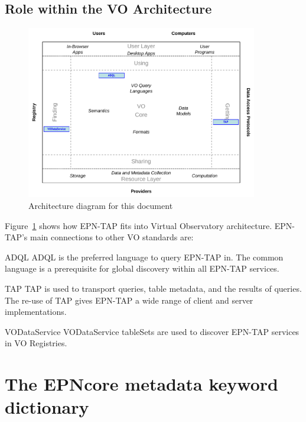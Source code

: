 \documentclass[11pt,a4paper]{ivoa}
\begin{document}
\subsection{Role within the VO Architecture}

\begin{figure}[thb]
\centering

\includegraphics[width=0.9\textwidth]{role_diagram.pdf}
\caption{Architecture diagram for this document}
\label{fig:archdiag}
\end{figure}


Figure~\ref{fig:archdiag} shows how EPN-TAP fits into Virtual
Observatory architecture.  EPN-TAP's main connections to other VO
standards are:

\begin{bigdescription}
\item[ADQL \citep{2008ivoa.spec.1030O}] ADQL is the preferred language to
query EPN-TAP in.  The common language is a prerequisite for global
discovery within all EPN-TAP services.
\item[TAP \citep{2010ivoa.spec.0327D}] TAP is used to transport queries,
table metadata, and the results of queries.  The re-use of TAP gives
EPN-TAP a wide range of client and server implementations.
\item[VODataService \citep{2010ivoa.spec.1202P}] VODataService tableSets are used to
discover EPN-TAP services in VO Registries.
\end{bigdescription}

\section{The EPNcore metadata keyword dictionary} 
\end{document}
